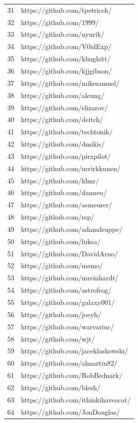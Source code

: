 \begin{center}
\begin{longtable}{|p{2cm}|p{7cm}|}
31 & https://github.com/tpetricek/ \\
32 & https://github.com/1999/ \\
33 & https://github.com/nyurik/ \\
34 & https://github.com/V0idExp/ \\
35 & https://github.com/khughitt/ \\
36 & https://github.com/kjjgibson/ \\
37 & https://github.com/mikesamuel/ \\
38 & https://github.com/aleung/ \\
39 & https://github.com/elizarov/ \\
40 & https://github.com/deitch/ \\
41 & https://github.com/techtonik/ \\
42 & https://github.com/dmikis/ \\
43 & https://github.com/pirxpilot/ \\
44 & https://github.com/mvirkkunen/ \\
45 & https://github.com/klmr/ \\
46 & https://github.com/danneu/ \\
47 & https://github.com/asmeurer/ \\
48 & https://github.com/rsp/ \\
49 & https://github.com/adamdruppe/ \\
50 & https://github.com/luksa/ \\
51 & https://github.com/DavidArno/ \\
52 & https://github.com/memo/ \\
53 & https://github.com/mreinhardt/ \\
54 & https://github.com/astrofrog/ \\
55 & https://github.com/galaxy001/ \\
56 & https://github.com/joeyh/ \\
57 & https://github.com/warvariuc/ \\
58 & https://github.com/wjt/ \\
59 & https://github.com/jaceklaskowski/ \\
60 & https://github.com/almartin82/ \\
61 & https://github.com/RobBednark/ \\
62 & https://github.com/blesh/ \\
63 & https://github.com/ithinkihaveacat/ \\
64 & https://github.com/JonDouglas/ \\

\end{longtable}
\end{center}
